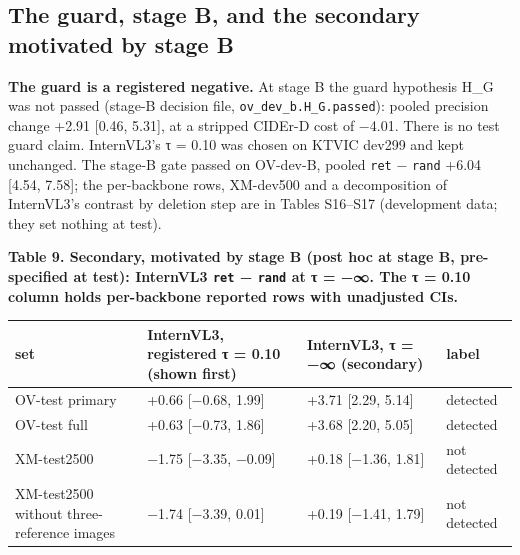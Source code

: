 \documentclass[manuscript,screen]{acmart}
\begin{document}
\subsection{The guard, stage B, and the secondary motivated by stage
B}\label{the-guard-stage-b-and-the-secondary-motivated-by-stage-b}

\textbf{The guard is a registered negative.} At stage B the guard hypothesis H\_G was not passed
(stage-B decision file, \texttt{ov\_dev\_b.H\_G.passed}): pooled precision change +2.91 {[}0.46,
5.31{]}, at a stripped CIDEr-D cost of −4.01. There is no test guard claim. InternVL3's τ = 0.10 was
chosen on KTVIC dev299 and kept unchanged. The stage-B gate passed on OV-dev-B, pooled \texttt{ret}
− \texttt{rand} +6.04 {[}4.54, 7.58{]}; the per-backbone rows, XM-dev500 and a decomposition of
InternVL3's contrast by deletion step are in Tables S16--S17 (development data; they set nothing at
test).

\textbf{Table 9. Secondary, motivated by stage B (post hoc at stage B, pre-specified at test):
InternVL3 \texttt{ret} − \texttt{rand} at τ = −∞. The τ = 0.10 column holds per-backbone reported
rows with unadjusted CIs.}

\begin{longtable}[]{@{}
  >{\raggedright\arraybackslash}p{}
  >{\raggedright\arraybackslash}p{}
  >{\raggedright\arraybackslash}p{}
  >{\raggedright\arraybackslash}p{}@{}}
\toprule\noalign{}
\begin{minipage}[b]{\linewidth}\raggedright
set
\end{minipage} & \begin{minipage}[b]{\linewidth}\raggedright
InternVL3, registered τ = 0.10 (shown first)
\end{minipage} & \begin{minipage}[b]{\linewidth}\raggedright
InternVL3, τ = −∞ (secondary)
\end{minipage} & \begin{minipage}[b]{\linewidth}\raggedright
label
\end{minipage} \\
\midrule\noalign{}
\endhead
\bottomrule\noalign{}
\endlastfoot
OV-test primary & +0.66 {[}−0.68, 1.99{]} & +3.71 {[}2.29, 5.14{]} & detected \\
OV-test full & +0.63 {[}−0.73, 1.86{]} & +3.68 {[}2.20, 5.05{]} & detected \\
XM-test2500 & −1.75 {[}−3.35, −0.09{]} & +0.18 {[}−1.36, 1.81{]} & not detected \\
XM-test2500 without three-reference images & −1.74 {[}−3.39, 0.01{]} & +0.19 {[}−1.41, 1.79{]} & not
detected \\
\end{longtable}
\end{document}
